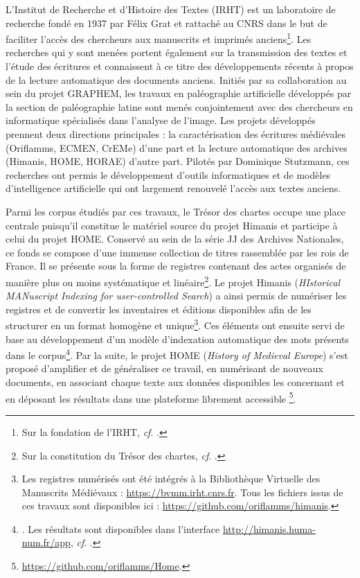 \documentclass[a4paper,12pt,twoside]{book}
\begin{document}
	L'Institut de Recherche et d'Histoire des Textes (IRHT) est un laboratoire de recherche fondé en 1937 par Félix Grat et rattaché au CNRS dans le but de faciliter l'accès des chercheurs aux manuscrits et imprimés anciens\footnote{Sur la fondation de l'IRHT, \textit{cf}. \cite{holtz_les_2000}.}. Les recherches qui y sont menées portent également sur la transmission des textes et l'étude des écritures et connaissent à ce titre des développements récents à propos de la lecture automatique des documents anciens. Initiés par sa collaboration au sein du projet GRAPHEM, les travaux en \og paléographie artificielle\fg{} développés par la section de paléographie latine sont menés conjointement avec des chercheurs en informatique spécialisés dans l'analyse de l'image. Les projets développés prennent deux directions principales : la caractérisation des écritures médiévales (Oriflamms, ECMEN, CrEMe) d'une part et la lecture automatique des archives (Himanis, HOME, HORAE) d'autre part. Pilotés par Dominique Stutzmann, ces recherches ont permis le développement d'outils informatiques et de modèles d'intelligence artificielle qui ont largement renouvelé l'accès aux textes anciens.
	
	Parmi les corpus étudiés par ces travaux, le Trésor des chartes occupe une place centrale puisqu'il constitue le matériel source du projet Himanis et participe à celui du projet HOME. Conservé au sein de la série JJ des Archives Nationales, ce fonds se compose d'une immense collection de titres rassemblée par les rois de France. Il se présente sous la forme de registres contenant des actes organisés de manière plus ou moins systématique et linéaire\footnote{Sur la constitution du Trésor des chartes, \textit{cf}. \cite{potin_mise_2007}.}. Le projet Himanis (\textit{HIstorical MANuscript Indexing for user-controlled Search}) a ainsi permis de numériser les registres et de convertir les inventaires et éditions disponibles afin de les structurer en un format homogène et unique\footnote{Les registres numérisés ont été intégrés à la Bibliothèque Virtuelle des Manuscrits Médiévaux : \url{https://bvmm.irht.cnrs.fr}. Tous les fichiers issus de ces travaux sont disponibles ici : \url{https://github.com/oriflamms/himanis}.}. Ces éléments ont ensuite servi de base au développement d'un modèle d'indexation automatique des mots présents dans le corpus\footnote{\cites{stutzmann_recherche_2017}. Les résultats sont disponibles dans l'interface \url{http://himanis.huma-num.fr/app}, \textit{cf}. \cite{bluche_preparatory_2017}.}. Par la suite, le projet HOME (\textit{History of Medieval Europe}) s'est proposé d'amplifier et de généraliser ce travail, en numérisant de nouveaux documents, en associant chaque texte aux données disponibles les concernant et en déposant les résultats dans une plateforme librement accessible \footnote{\url{https://github.com/oriflamms/Home}.}.
	
\end{document}

